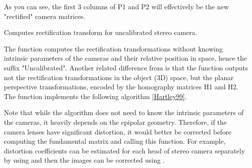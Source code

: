 As you can see, the first 3 columns of P1 and P2 will effectively be the new "rectified" camera matrices. 

Computes rectification transform for uncalibrated stereo camera.


\begin{description}
\end{description}

The function computes the rectification transformations without knowing intrinsic parameters of the cameras and their relative position in space, hence the suffix "Uncalibrated". Another related difference from  is that the function outputs not the rectification transformations in the object (3D) space, but the planar perspective transformations, encoded by the homography matrices H1 and H2. The function implements the following algorithm \href{\#Hartly99}{[Hartley99]}. 

Note that while the algorithm does not need to know the intrinsic parameters of the cameras, it heavily depends on the epipolar geometry. Therefore, if the camera lenses have significant distortion, it would better be corrected before computing the fundamental matrix and calling this function. For example, distortion coefficients can be estimated for each head of stereo camera separately by using  and then the images can be corrected using . 

